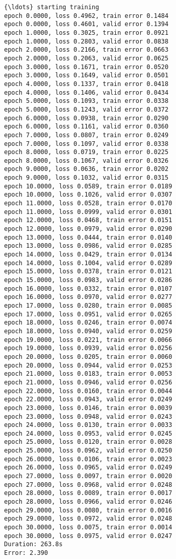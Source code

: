 \documentclass[11pt]{article}
\begin{document}
    \begin{Verbatim}[commandchars=\\\{\}]
{\ldots} starting training
epoch 0.0000, loss 0.4962, train error 0.1484
epoch 0.0000, loss 0.4601, valid error 0.1394
epoch 1.0000, loss 0.3025, train error 0.0921
epoch 1.0000, loss 0.2803, valid error 0.0838
epoch 2.0000, loss 0.2166, train error 0.0663
epoch 2.0000, loss 0.2063, valid error 0.0625
epoch 3.0000, loss 0.1671, train error 0.0520
epoch 3.0000, loss 0.1649, valid error 0.0501
epoch 4.0000, loss 0.1337, train error 0.0418
epoch 4.0000, loss 0.1406, valid error 0.0434
epoch 5.0000, loss 0.1093, train error 0.0338
epoch 5.0000, loss 0.1243, valid error 0.0372
epoch 6.0000, loss 0.0938, train error 0.0290
epoch 6.0000, loss 0.1161, valid error 0.0360
epoch 7.0000, loss 0.0807, train error 0.0249
epoch 7.0000, loss 0.1097, valid error 0.0338
epoch 8.0000, loss 0.0719, train error 0.0225
epoch 8.0000, loss 0.1067, valid error 0.0326
epoch 9.0000, loss 0.0636, train error 0.0202
epoch 9.0000, loss 0.1032, valid error 0.0315
epoch 10.0000, loss 0.0589, train error 0.0189
epoch 10.0000, loss 0.1026, valid error 0.0307
epoch 11.0000, loss 0.0528, train error 0.0170
epoch 11.0000, loss 0.0999, valid error 0.0301
epoch 12.0000, loss 0.0468, train error 0.0151
epoch 12.0000, loss 0.0979, valid error 0.0290
epoch 13.0000, loss 0.0444, train error 0.0140
epoch 13.0000, loss 0.0986, valid error 0.0285
epoch 14.0000, loss 0.0429, train error 0.0134
epoch 14.0000, loss 0.1004, valid error 0.0289
epoch 15.0000, loss 0.0378, train error 0.0121
epoch 15.0000, loss 0.0983, valid error 0.0286
epoch 16.0000, loss 0.0332, train error 0.0107
epoch 16.0000, loss 0.0970, valid error 0.0277
epoch 17.0000, loss 0.0280, train error 0.0085
epoch 17.0000, loss 0.0951, valid error 0.0265
epoch 18.0000, loss 0.0246, train error 0.0074
epoch 18.0000, loss 0.0940, valid error 0.0259
epoch 19.0000, loss 0.0221, train error 0.0066
epoch 19.0000, loss 0.0939, valid error 0.0256
epoch 20.0000, loss 0.0205, train error 0.0060
epoch 20.0000, loss 0.0944, valid error 0.0253
epoch 21.0000, loss 0.0183, train error 0.0053
epoch 21.0000, loss 0.0946, valid error 0.0256
epoch 22.0000, loss 0.0160, train error 0.0044
epoch 22.0000, loss 0.0943, valid error 0.0249
epoch 23.0000, loss 0.0146, train error 0.0039
epoch 23.0000, loss 0.0948, valid error 0.0243
epoch 24.0000, loss 0.0130, train error 0.0033
epoch 24.0000, loss 0.0953, valid error 0.0245
epoch 25.0000, loss 0.0120, train error 0.0028
epoch 25.0000, loss 0.0962, valid error 0.0250
epoch 26.0000, loss 0.0106, train error 0.0023
epoch 26.0000, loss 0.0965, valid error 0.0249
epoch 27.0000, loss 0.0097, train error 0.0020
epoch 27.0000, loss 0.0968, valid error 0.0248
epoch 28.0000, loss 0.0089, train error 0.0017
epoch 28.0000, loss 0.0966, valid error 0.0246
epoch 29.0000, loss 0.0080, train error 0.0016
epoch 29.0000, loss 0.0972, valid error 0.0248
epoch 30.0000, loss 0.0075, train error 0.0014
epoch 30.0000, loss 0.0975, valid error 0.0247
Duration: 263.8s
Error: 2.390

    \end{Verbatim}
\end{document}
